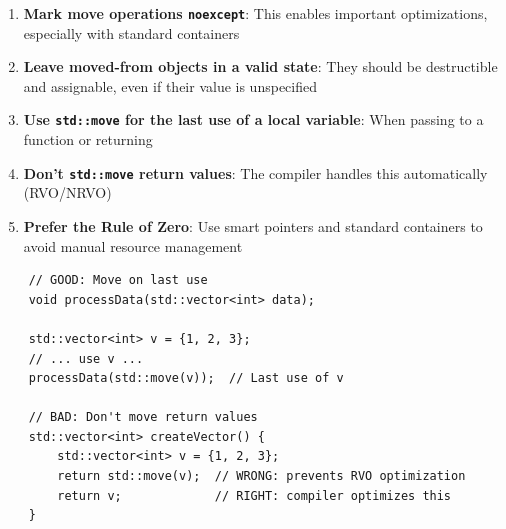 \begin{enumerate}
	\item \textbf{Mark move operations \texttt{noexcept}}: This enables important optimizations, especially with standard containers
	
	\item \textbf{Leave moved-from objects in a valid state}: They should be destructible and assignable, even if their value is unspecified
	
	\item \textbf{Use \texttt{std::move} for the last use of a local variable}: When passing to a function or returning
	
	\item \textbf{Don't \texttt{std::move} return values}: The compiler handles this automatically (RVO/NRVO)
	
	\item \textbf{Prefer the Rule of Zero}: Use smart pointers and standard containers to avoid manual resource management
\end{enumerate}

\begin{lstlisting}
	// GOOD: Move on last use
	void processData(std::vector<int> data);
	
	std::vector<int> v = {1, 2, 3};
	// ... use v ...
	processData(std::move(v));  // Last use of v
	
	// BAD: Don't move return values
	std::vector<int> createVector() {
		std::vector<int> v = {1, 2, 3};
		return std::move(v);  // WRONG: prevents RVO optimization
		return v;             // RIGHT: compiler optimizes this
	}
\end{lstlisting}